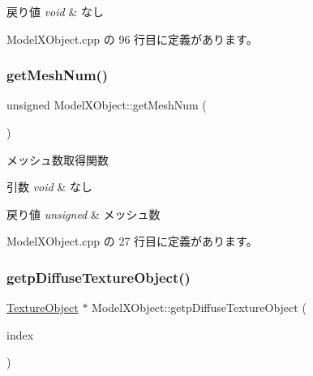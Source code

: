 \begin{DoxyRetVals}{戻り値}
{\em void} & なし \\
\hline
\end{DoxyRetVals}


 Model\+X\+Object.\+cpp の 96 行目に定義があります。

\mbox{\label{class_model_x_object_a894790eda90cf0cc202b86f854583fda}} 
\subsubsection{\texorpdfstring{get\+Mesh\+Num()}{getMeshNum()}}
{\footnotesize\ttfamily unsigned Model\+X\+Object\+::get\+Mesh\+Num (\begin{DoxyParamCaption}{ }\end{DoxyParamCaption})}



メッシュ数取得関数 


\begin{DoxyParams}{引数}
{\em void} & なし \\
\hline
\end{DoxyParams}

\begin{DoxyRetVals}{戻り値}
{\em unsigned} & メッシュ数 \\
\hline
\end{DoxyRetVals}


 Model\+X\+Object.\+cpp の 27 行目に定義があります。

\mbox{\label{class_model_x_object_a6398eb50785789e5145803fd4981bc2c}} 
\subsubsection{\texorpdfstring{getp\+Diffuse\+Texture\+Object()}{getpDiffuseTextureObject()}}
{\footnotesize\ttfamily \mbox{\hyperlink{class_texture_object}{Texture\+Object}} $\ast$ Model\+X\+Object\+::getp\+Diffuse\+Texture\+Object (\begin{DoxyParamCaption}\item[{unsigned}]{index }\end{DoxyParamCaption})}



